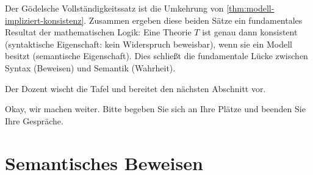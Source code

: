 \begin{ai-global-state-checkpoint-invisible-content}
\end{ai-global-state-checkpoint-invisible-content}

\begin{math-stroke}

\begin{explanation-of-steps}
Der Gödelsche Vollständigkeitssatz ist die Umkehrung von \cref{thm:modell-impliziert-konsistenz}. Zusammen ergeben diese beiden Sätze ein fundamentales Resultat der mathematischen Logik: Eine Theorie $T$ ist genau dann konsistent (syntaktische Eigenschaft: kein Widerspruch beweisbar), wenn sie ein Modell besitzt (semantische Eigenschaft). Dies schließt die fundamentale Lücke zwischen Syntax (Beweisen) und Semantik (Wahrheit).
\end{explanation-of-steps}
\end{math-stroke}


\begin{meta-note}[Tafelreinigung]
Der Dozent wischt die Tafel und bereitet den nächsten Abschnitt vor.
\end{meta-note}

\begin{spoken-clean}[00:35:10 - 00:37:10]
Okay, wir machen weiter. Bitte begeben Sie sich an Ihre Plätze und beenden Sie Ihre Gespräche.
\end{spoken-clean}

\section{Semantisches Beweisen}


